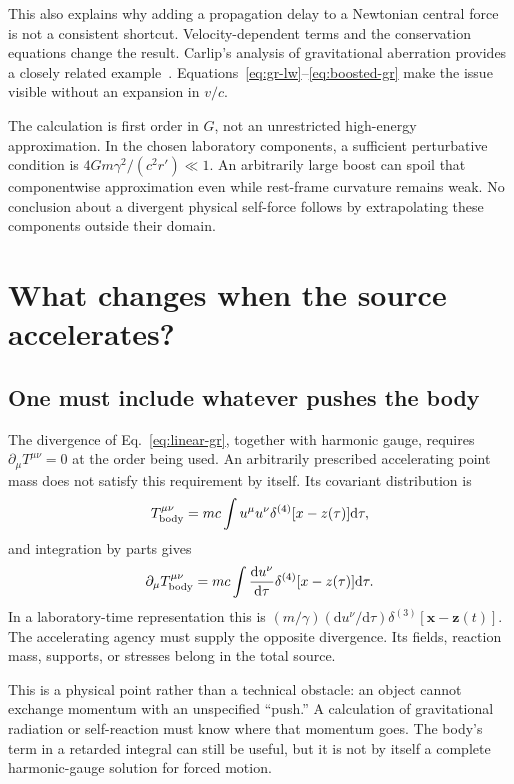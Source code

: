 \documentclass[11pt,a4paper]{article}
\numberwithin{equation}{section}
\newcommand{\dd}{\mathrm{d}}
\begin{document}
This also explains why adding a propagation delay to a Newtonian central force is not a consistent shortcut. Velocity-dependent terms and the conservation equations change the result. Carlip's analysis of gravitational aberration provides a closely related example~\cite{carlip}. Equations~\eqref{eq:gr-lw}--\eqref{eq:boosted-gr} make the issue visible without an expansion in $v/c$.

The calculation is first order in $G$, not an unrestricted high-energy approximation. In the chosen laboratory components, a sufficient perturbative condition is $4Gm\gamma^2/(c^2r')\ll1$. An arbitrarily large boost can spoil that componentwise approximation even while rest-frame curvature remains weak. No conclusion about a divergent physical self-force follows by extrapolating these components outside their domain.

\section{What changes when the source accelerates?}
\label{sec:radiation}

\subsection{One must include whatever pushes the body}

The divergence of Eq.~\eqref{eq:linear-gr}, together with harmonic gauge, requires $\partial_\mu T^{\mu\nu}=0$ at the order being used. An arbitrarily prescribed accelerating point mass does not satisfy this requirement by itself. Its covariant distribution is
\begin{equation}
 T_{\rm body}^{\mu\nu}=mc\int u^\mu u^\nu
 \delta^{(4)}[x-z(\tau)]\dd\tau,
\end{equation}
and integration by parts gives
\begin{equation}
 \partial_\mu T_{\rm body}^{\mu\nu}
 =mc\int\frac{\dd u^\nu}{\dd\tau}\delta^{(4)}[x-z(\tau)]\dd\tau.
 \label{eq:nonconserved}
\end{equation}
In a laboratory-time representation this is
$(m/\gamma)(\dd u^\nu/\dd\tau)\delta^{(3)}[\bm x-\bm z(t)]$.
The accelerating agency must supply the opposite divergence. Its fields, reaction mass, supports, or stresses belong in the total source.

This is a physical point rather than a technical obstacle: an object cannot exchange momentum with an unspecified ``push.'' A calculation of gravitational radiation or self-reaction must know where that momentum goes. The body's term in a retarded integral can still be useful, but it is not by itself a complete harmonic-gauge solution for forced motion.
\end{document}

